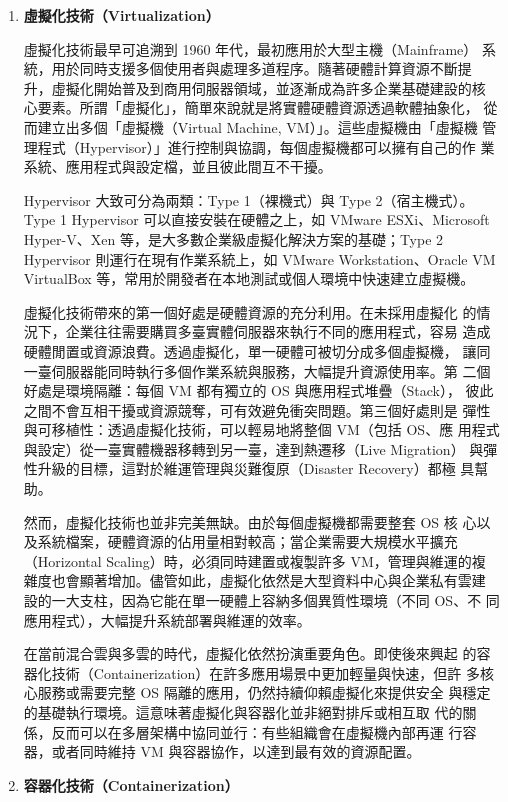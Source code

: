 \documentclass[12pt,a4paper]{article}
\begin{document}
\begin{enumerate}[label={(\zhdig*)}, leftmargin=2\parindent, listparindent=\parindent]
\begin{enumerate}[label={(\arabic*)}, leftmargin=\parindent, listparindent=\parindent]
\item\textbf{虛擬化技術（Virtualization）\cite{8}}

    虛擬化技術最早可追溯到 1960 年代，最初應用於大型主機（Mainframe）
    系統，用於同時支援多個使用者與處理多道程序。隨著硬體計算資源不斷提
    升，虛擬化開始普及到商用伺服器領域，並逐漸成為許多企業基礎建設的核
    心要素。所謂「虛擬化」，簡單來說就是將實體硬體資源透過軟體抽象化，
    從而建立出多個「虛擬機（Virtual Machine, VM）」。這些虛擬機由「虛擬機
    管理程式（Hypervisor）」進行控制與協調，每個虛擬機都可以擁有自己的作
    業系統、應用程式與設定檔，並且彼此間互不干擾。

    Hypervisor 大致可分為兩類：Type 1（裸機式）與 Type 2（宿主機式）。
    Type 1 Hypervisor 可以直接安裝在硬體之上，如 VMware ESXi、Microsoft
    Hyper-V、Xen 等，是大多數企業級虛擬化解決方案的基礎；Type 2
    Hypervisor 則運行在現有作業系統上，如 VMware Workstation、Oracle VM
    VirtualBox 等，常用於開發者在本地測試或個人環境中快速建立虛擬機。

    虛擬化技術帶來的第一個好處是硬體資源的充分利用。在未採用虛擬化
    的情況下，企業往往需要購買多臺實體伺服器來執行不同的應用程式，容易
    造成硬體閒置或資源浪費。透過虛擬化，單一硬體可被切分成多個虛擬機，
    讓同一臺伺服器能同時執行多個作業系統與服務，大幅提升資源使用率。第
    二個好處是環境隔離：每個 VM 都有獨立的 OS 與應用程式堆疊（Stack），
    彼此之間不會互相干擾或資源競奪，可有效避免衝突問題。第三個好處則是
    彈性與可移植性：透過虛擬化技術，可以輕易地將整個 VM（包括 OS、應
    用程式與設定）從一臺實體機器移轉到另一臺，達到熱遷移（Live Migration）
    與彈性升級的目標，這對於維運管理與災難復原（Disaster Recovery）都極
    具幫助。

    然而，虛擬化技術也並非完美無缺。由於每個虛擬機都需要整套 OS 核
    心以及系統檔案，硬體資源的佔用量相對較高；當企業需要大規模水平擴充
    （Horizontal Scaling）時，必須同時建置或複製許多 VM，管理與維運的複
    雜度也會顯著增加。儘管如此，虛擬化依然是大型資料中心與企業私有雲建
    設的一大支柱，因為它能在單一硬體上容納多個異質性環境（不同 OS、不
    同應用程式），大幅提升系統部署與維運的效率。

    在當前混合雲與多雲的時代，虛擬化依然扮演重要角色。即使後來興起
    的容器化技術（Containerization）在許多應用場景中更加輕量與快速，但許
    多核心服務或需要完整 OS 隔離的應用，仍然持續仰賴虛擬化來提供安全
    與穩定的基礎執行環境。這意味著虛擬化與容器化並非絕對排斥或相互取
    代的關係，反而可以在多層架構中協同並行：有些組織會在虛擬機內部再運
    行容器，或者同時維持 VM 與容器協作，以達到最有效的資源配置。
\item\textbf{
容器化技術（Containerization）\cite{9}
}


\end{enumerate}
\end{enumerate}
\end{document}
